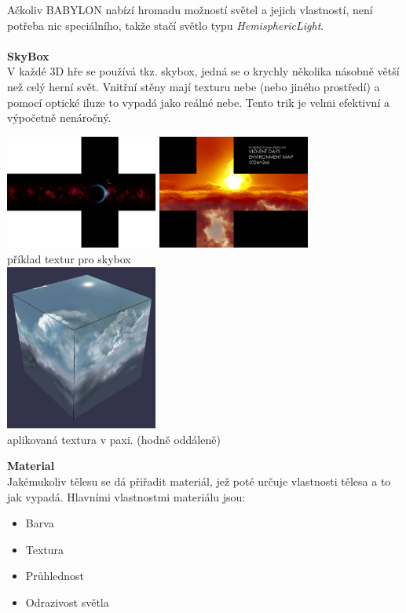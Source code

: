 \documentclass[a4paper,titlepage]{article}
\begin{document}
			Ačkoliv BABYLON nabízí hromadu možností světel a jejich vlastností, není potřeba nic speciálního,
			takže stačí světlo typu \textit{HemisphericLight}.\\	
			\\
		\textbf{SkyBox}\cite{Skybox}\\
			V každé 3D hře se používá tkz. skybox, jedná se o krychly několika násobně větší než celý herní svět.
			Vnitřní stěny mají texturu nebe (nebo jiného prostředí) a pomocí optické iluze to vypadá jako reálné nebe.
			Tento trik je velmi efektivní a výpočetně nenáročný.\\
			\begin{center}	
				\includegraphics[width=5cm]{space_skybox_by_orindoomhammer.jpg}
				\includegraphics[width=5cm]{violentdays_large.jpg}	\\
				příklad textur pro skybox\\
				
				\includegraphics[width=5cm]{skybox.jpg}\\
				aplikovaná textura v paxi. (hodně oddáleně)
			\end{center}		
				
			
		\textbf{Material}\\
			Jakémukoliv tělesu se dá přiřadit materiál, jež poté určuje vlastnosti tělesa a to jak vypadá.
			Hlavními vlastnostmi materiálu jsou:
			\begin{itemize}
				\item Barva
				\item Textura
				\item Průhlednost
				\item Odrazivost světla
			\end{itemize}	
\end{document}
